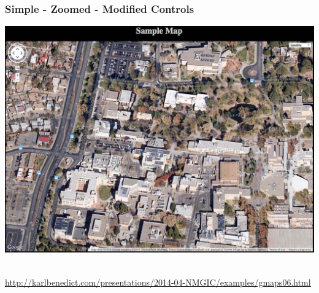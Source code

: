 \documentclass[]{article}
\begin{document}
\subsubsection{Simple - Zoomed - Modified
Controls}\label{simple---zoomed---modified-controls}

\includegraphics{images/google_06.jpg}~

\url{http://karlbenedict.com/presentations/2014-04-NMGIC/examples/gmaps06.html}
\end{document}
